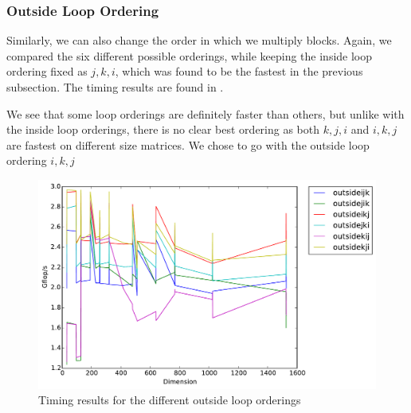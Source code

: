 \subsubsection{Outside Loop Ordering}
Similarly, we can also change the order in which we multiply blocks. Again, we
compared the six different possible orderings, while keeping the inside loop
ordering fixed as $j,k,i$, which was found to be the fastest in the previous
subsection. The timing results are found in .

We see that some loop orderings are definitely faster than others, but unlike
with the inside loop orderings, there is no clear best ordering as both $k,j,i$
and $i,k,j$ are fastest on different size matrices. We chose to go with the
outside loop ordering $i,k,j$

\begin{figure}[hh]
  \centering
  \includegraphics[width=\textwidth]{img/timing_outsideloops.pdf}
  \caption{Timing results for the different outside loop orderings}
  \label{fig:outsideloop}
\end{figure}

